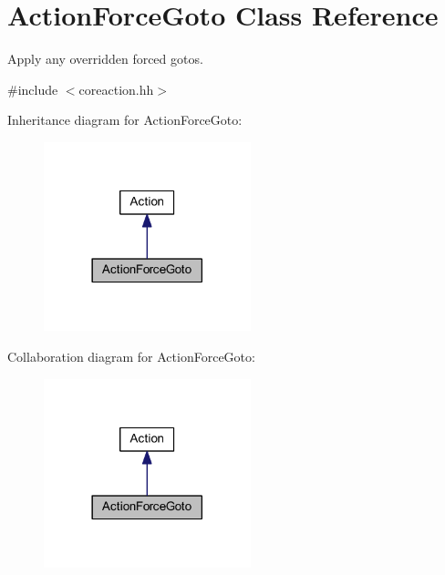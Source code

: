 \hypertarget{class_action_force_goto}{}\section{Action\+Force\+Goto Class Reference}
\label{class_action_force_goto}


Apply any overridden forced gotos.  




{\ttfamily \#include $<$coreaction.\+hh$>$}



Inheritance diagram for Action\+Force\+Goto\+:
\nopagebreak
\begin{figure}[H]
\begin{center}
\leavevmode
\includegraphics[width=170pt]{class_action_force_goto__inherit__graph}
\end{center}
\end{figure}


Collaboration diagram for Action\+Force\+Goto\+:
\nopagebreak
\begin{figure}[H]
\begin{center}
\leavevmode
\includegraphics[width=170pt]{class_action_force_goto__coll__graph}
\end{center}
\end{figure}
